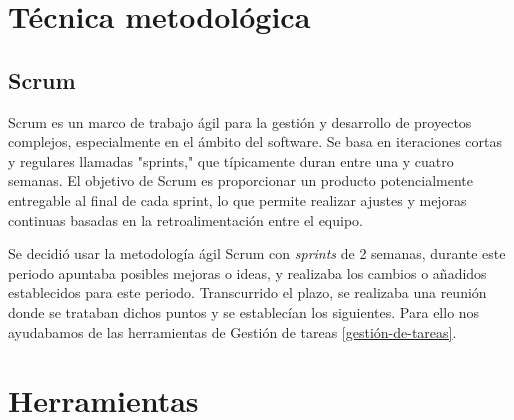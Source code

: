 
\begin{comment}
Esta parte de la memoria tiene como objetivo presentar las técnicas metodológicas y las herramientas de desarrollo que se han utilizado para llevar a cabo el proyecto. Si se han estudiado diferentes alternativas de metodologías, herramientas, bibliotecas se puede hacer un resumen de los aspectos más destacados de cada alternativa, incluyendo comparativas entre las distintas opciones y una justificación de las elecciones realizadas. 
No se pretende que este apartado se convierta en un capítulo de un libro dedicado a cada una de las alternativas, sino comentar los aspectos más destacados de cada opción, con un repaso somero a los fundamentos esenciales y referencias bibliográficas para que el lector pueda ampliar su conocimiento sobre el tema.
\end{comment}


\section{Técnica metodológica}

\subsection{Scrum}

Scrum es un marco de trabajo ágil para la gestión y desarrollo de proyectos complejos, especialmente en el ámbito del software. Se basa en iteraciones cortas y regulares llamadas "sprints," que típicamente duran entre una y cuatro semanas. El objetivo de Scrum es proporcionar un producto potencialmente entregable al final de cada sprint, lo que permite realizar ajustes y mejoras continuas basadas en la retroalimentación entre el equipo. \cite{schwaber2020}

Se decidió usar la metodología ágil Scrum con \textit{sprints} de 2 semanas, durante este periodo apuntaba posibles mejoras o ideas, y realizaba los cambios o añadidos establecidos para este periodo. Transcurrido el plazo, se realizaba una reunión donde se trataban dichos puntos y se establecían los siguientes. Para ello nos ayudabamos de las herramientas de Gestión de tareas \ref{gestión-de-tareas}.


\section{Herramientas}

